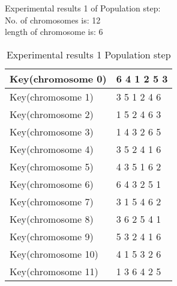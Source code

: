 \textsf{Experimental results 1 of Population step:}\\
    \colorbox{blue!30}{\textsf{     No. of chromosomes is: 12}}\\
    \colorbox{blue!30}{\textsf{     length of chromosome is: 6}}

\begin{table}[H]
\centering
\begin{tabular}{l l}\hline
    Key(chromosome 0)&6 4 1 2 5 3\\ \hline 
    Key(chromosome 1)&3 5 1 2 4 6 \\ \hline 
    Key(chromosome 2)&1 5 2 4 6 3 \\ \hline 
    Key(chromosome 3)&1 4 3 2 6 5 \\ \hline 
    Key(chromosome 4)&3 5 2 4 1 6 \\ \hline 
    Key(chromosome 5)&4 3 5 1 6 2 \\ \hline 
    Key(chromosome 6)&6 4 3 2 5 1 \\ \hline 
    Key(chromosome 7)&3 1 5 4 6 2 \\ \hline 
    Key(chromosome 8)&3 6 2 5 4 1 \\ \hline 
    Key(chromosome 9)&5 3 2 4 1 6 \\ \hline 
    Key(chromosome 10)&4 1 5 3 2 6 \\ \hline 
    Key(chromosome 11)&1 3 6 4 2 5 \\ \hline  
\end{tabular}
\caption{Experimental results 1 Population step}

\end{table}


